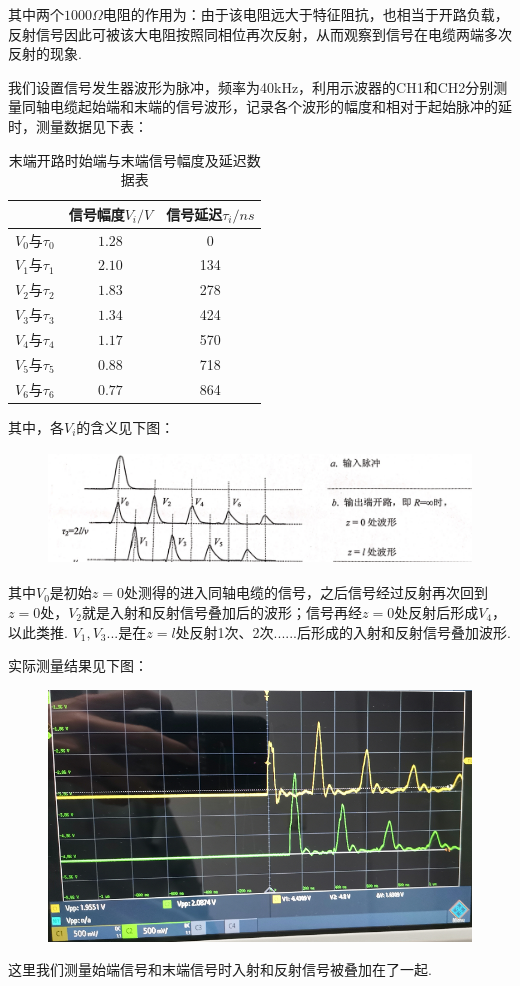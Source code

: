 \documentclass[UTF8]{ctexart}
\begin{document}
其中两个$1000\Omega$电阻的作用为：由于该电阻远大于特征阻抗，也相当于开路负载，反射信号因此可被该大电阻按照同相位再次反射，从而观察到信号在电缆两端多次反射的现象. \par
我们设置信号发生器波形为脉冲，频率为40kHz，利用示波器的CH1和CH2分别测量同轴电缆起始端和末端的信号波形，记录各个波形的幅度和相对于起始脉冲的延时，测量数据见下表：
\begin{table}[H]
   \centering
\begin{tabular}{|c|c|c|}
       \hline
       &信号幅度$V_i/V$&信号延迟$\tau_i/ns$\\
       \hline
       $V_0$与$\tau_0$&$1.28$&0\\
       \hline
       $V_1$与$\tau_1$&$2.10$&134\\ 
       \hline
       $V_2$与$\tau_2$&$1.83$&278\\ 
       \hline
       $V_3$与$\tau_3$&$1.34$&424\\ 
       \hline
       $V_4$与$\tau_4$&$1.17$&570\\ 
       \hline
       $V_5$与$\tau_5$&$0.88$&718\\ 
       \hline
       $V_6$与$\tau_6$&$0.77$&864\\ 
       \hline
   \end{tabular}  
   \caption{末端开路时始端与末端信号幅度及延迟数据表} 
\end{table} 
其中，各$V_i$的含义见下图：
\begin{figure}[H]
    \centering
    \includegraphics[width=15cm,height=3cm]{7}      
\end{figure}
其中$V_0$是初始$z=0$处测得的进入同轴电缆的信号，之后信号经过反射再次回到$z=0$处，$V_2$就是入射和反射信号叠加后的波形；信号再经$z=0$处反射后形成$V_4$，以此类推. $V_1, V_3...$是在$z=l$处反射1次、2次......后形成的入射和反射信号叠加波形.\par
实际测量结果见下图：
\begin{figure}[H]\begin{center}
    \includegraphics[scale=0.7]{31.PNG}
\end{center}\end{figure}
这里我们测量始端信号和末端信号时入射和反射信号被叠加在了一起.
\end{document}
